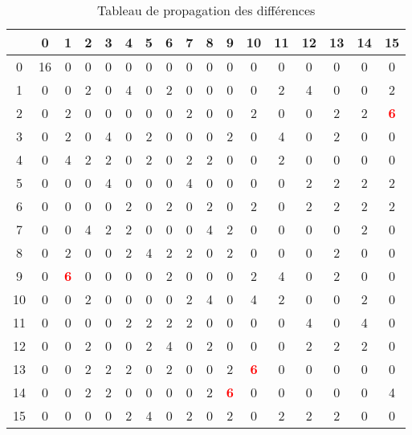 \documentclass[a4paper,11pt]{article}
\begin{document}
\begin{table}[h]
    \begin{center}
    \begin{tabular}{|c|cccccccccccccccc|}\hline
           & 0 & 1 & 2 & 3 & 4 & 5 & 6 & 7 & 8 & 9 & 10 & 11 & 12 & 13 & 14 & 15 \\ \hline
         0 & 16 & 0 & 0 & 0 & 0 & 0 & 0 & 0 & 0 & 0 & 0 & 0 & 0 & 0 & 0 & 0 \\
         1 & 0 & 0 & 2 & 0 & 4 & 0 & 2 & 0 & 0 & 0 & 0 & 2 & 4 & 0 & 0 & 2 \\
         2 & 0 & 2 & 0 & 0 & 0 & 0 & 0 & 2 & 0 & 0 & 2 & 0 & 0 & 2 & 2 & \textbf{\textcolor{red}{6}} \\
         3 & 0 & 2 & 0 & 4 & 0 & 2 & 0 & 0 & 0 & 2 & 0 & 4 & 0 & 2 & 0 & 0 \\
         4 & 0 & 4 & 2 & 2 & 0 & 2 & 0 & 2 & 2 & 0 & 0 & 2 & 0 & 0 & 0 & 0 \\
         5 & 0 & 0 & 0 & 4 & 0 & 0 & 0 & 4 & 0 & 0 & 0 & 0 & 2 & 2 & 2 & 2 \\
         6 & 0 & 0 & 0 & 0 & 2 & 0 & 2 & 0 & 2 & 0 & 2 & 0 & 2 & 2 & 2 & 2 \\
         7 & 0 & 0 & 4 & 2 & 2 & 0 & 0 & 0 & 4 & 2 & 0 & 0 & 0 & 0 & 2 & 0 \\
         8 & 0 & 2 & 0 & 0 & 2 & 4 & 2 & 2 & 0 & 2 & 0 & 0 & 0 & 2 & 0 & 0 \\
        9 & 0 & \textbf{\textcolor{red}{6}} & 0 & 0 & 0 & 0 & 2 & 0 & 0 & 0 & 2 & 4 & 0 & 2 & 0 & 0 \\
        10 & 0 & 0 & 2 & 0 & 0 & 0 & 0 & 2 & 4 & 0 & 4 & 2 & 0 & 0 & 2 & 0 \\
        11 & 0 & 0 & 0 & 0 & 2 & 2 & 2 & 2 & 0 & 0 & 0 & 0 & 4 & 0 & 4 & 0 \\
        12 & 0 & 0 & 2 & 0 & 0 & 2 & 4 & 0 & 2 & 0 & 0 & 0 & 2 & 2 & 2 & 0 \\
        13 & 0 & 0 & 2 & 2 & 2 & 0 & 2 & 0 & 0 & 2 & \textbf{\textcolor{red}{6}} & 0 & 0 & 0 & 0 & 0 \\
        14 & 0 & 0 & 2 & 2 & 0 & 0 & 0 & 0 & 2 & \textbf{\textcolor{red}{6}} & 0 & 0 & 0 & 0 & 0 & 4 \\
        15 & 0 & 0 & 0 & 0 & 2 & 4 & 0 & 2 & 0 & 2 & 0 & 2 & 2 & 2 & 0 & 0 \\ \hline
    \end{tabular}
    \end{center}
    \caption{Tableau de propagation des différences}
    \label{tabN}
\end{table}
    
\end{document}

